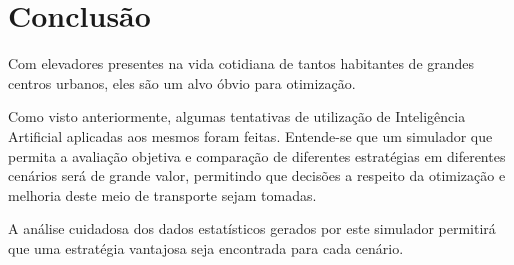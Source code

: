 \chapter{\label{chap:conclusion}Conclusão}

Com elevadores presentes na vida cotidiana de tantos habitantes de grandes
centros urbanos, eles são um alvo óbvio para otimização.

Como visto anteriormente, algumas tentativas de utilização de Inteligência
Artificial aplicadas aos mesmos foram feitas. Entende-se que um simulador que
permita a avaliação objetiva e comparação de diferentes estratégias em
diferentes cenários será de grande valor, permitindo que decisões a respeito da
otimização e melhoria deste meio de transporte sejam tomadas.

A análise cuidadosa dos dados estatísticos gerados por este simulador permitirá
que uma estratégia vantajosa seja encontrada para cada cenário.